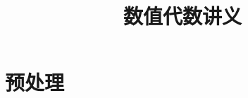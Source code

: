 \documentclass{book}
\begin{document}
\title{数值代数讲义}
\maketitle

\chapter{预处理}


\cite{stein2003}


\end{document}
